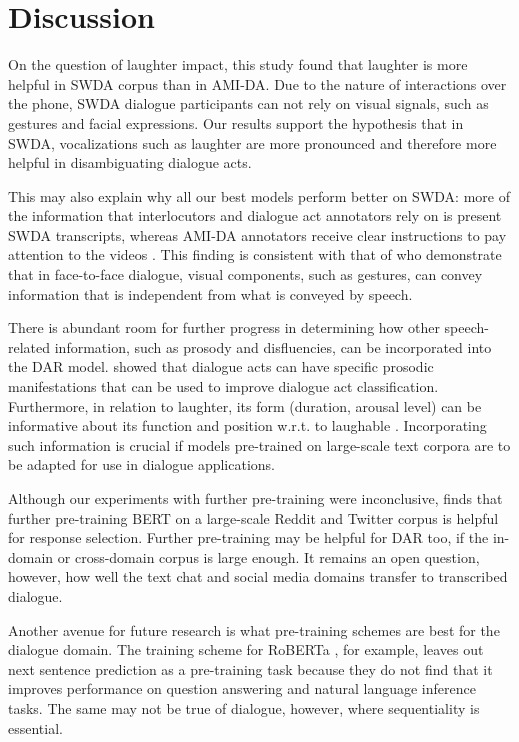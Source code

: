 \documentclass[11pt,a4paper]{article}
\begin{document}
\section{Discussion} %
On the question of laughter impact, this study found that laughter is more helpful in SWDA corpus than in AMI-DA.
Due to the nature of interactions over the phone, SWDA dialogue participants can not rely on visual signals, such as gestures and facial expressions.
Our results support the hypothesis that in SWDA, vocalizations such as laughter are more pronounced and therefore more helpful in disambiguating dialogue acts.

This may also explain why all our best models perform better on SWDA: more of the information that interlocutors and dialogue act annotators rely on is present SWDA transcripts, whereas AMI-DA annotators receive clear instructions to pay attention to the videos \citep{GuidelinesDialogueAct2005}.
This finding is consistent with that of \citet{bavelas2008gesturing} who demonstrate that in face-to-face dialogue, visual components, such as gestures, can convey information that is independent from what is conveyed by speech.

There is abundant room for further progress in determining how other speech-related information, such as prosody and disfluencies, can be incorporated into the DAR model.
\citet{stolckeDialogueActModeling2000} showed that dialogue acts can have specific prosodic manifestations that can be used to improve dialogue act classification.
Furthermore, in relation to laughter, its form (duration, arousal level) can be informative about its function and position w.r.t. to laughable \citep{tian2016we,mazzocconi2019phd}.
Incorporating such information is crucial if models pre-trained on large-scale text corpora are to be adapted for use in dialogue applications.

Although our experiments with further pre-training were inconclusive, \citet{baoPLATOPretrainedDialogue2019} finds that further pre-training BERT on a large-scale Reddit and Twitter corpus is helpful for response selection.
Further pre-training may be helpful for DAR too, if the in-domain or cross-domain corpus is large enough.
It remains an open question, however, how well the text chat and social media domains transfer to transcribed dialogue.

Another avenue for future research is what pre-training schemes are best for the dialogue domain.
The training scheme for RoBERTa \citep{liuRoBERTaRobustlyOptimized2019}, for example, leaves out next sentence prediction as a pre-training task because they do not find that it improves performance on question answering and natural language inference tasks.
The same may not be true of dialogue, however, where sequentiality is essential.
\end{document}
